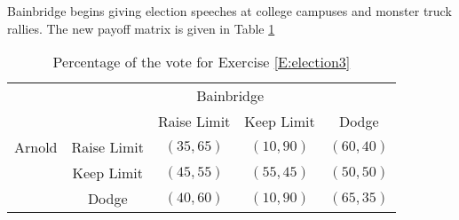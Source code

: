 
\begin{xca}\label{E:election3}
Bainbridge begins giving election speeches at college campuses and monster truck rallies.
The new payoff matrix is given in Table \ref{T:election3}





\begin{table}[h]
\centering

\begin{tabular}{ccccc}
                      & \multicolumn{4}{c}{Bainbridge}                                                  \\ \cline{2-5} 
\multicolumn{1}{l|}{} & \multicolumn{1}{l|}{} & \multicolumn{1}{c|}{Raise Limit} & \multicolumn{1}{c|}{Keep Limit} & \multicolumn{1}{c|}{Dodge}\\ \cline{2-5} 
\multicolumn{1}{l|}{Arnold} & \multicolumn{1}{c|}{Raise Limit} & \multicolumn{1}{c|}{$(35, 65)$} & \multicolumn{1}{c|}{$(10, 90)$} & \multicolumn{1}{c|}{$(60, 40)$}\\ \cline{2-5} 
\multicolumn{1}{l|}{} & \multicolumn{1}{c|}{Keep Limit} & \multicolumn{1}{c|}{$(45, 55)$} & \multicolumn{1}{c|}{$(55, 45)$} & \multicolumn{1}{c|}{$(50, 50)$}\\ \cline{2-5} 
\multicolumn{1}{l|}{} & \multicolumn{1}{c|}{Dodge} & \multicolumn{1}{c|}{$(40, 60)$} & \multicolumn{1}{c|}{$(10, 90)$} & \multicolumn{1}{c|}{$(65, 35)$} \\ \cline{2-5} 
\end{tabular}
\caption{Percentage of the vote for Exercise \ref{E:election3}}
\label{T:election3}
\end{table}



\end{xca}
